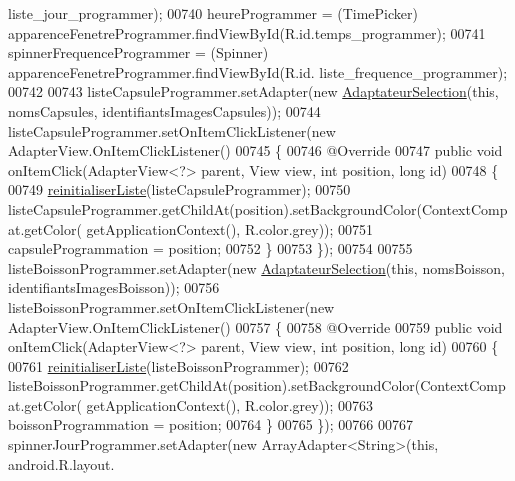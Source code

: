 \begin{DoxyCode}
      liste\_jour\_programmer);
00740         heureProgrammer = (TimePicker) apparenceFenetreProgrammer.findViewById(R.id.temps\_programmer);
00741         spinnerFrequenceProgrammer = (Spinner) apparenceFenetreProgrammer.findViewById(R.id.
      liste\_frequence\_programmer);
00742 
00743         listeCapsuleProgrammer.setAdapter(\textcolor{keyword}{new} \hyperlink{classcom_1_1example_1_1ekawa_1_1_ihm_1_1_adaptateur_selection_a41746ec1a290651b4cacb0894a32307b}{AdaptateurSelection}(\textcolor{keyword}{this}, nomsCapsules, 
      identifiantsImagesCapsules));
00744         listeCapsuleProgrammer.setOnItemClickListener(\textcolor{keyword}{new} AdapterView.OnItemClickListener()
00745         \{
00746             @Override
00747             \textcolor{keyword}{public} \textcolor{keywordtype}{void} onItemClick(AdapterView<?> parent, View view, \textcolor{keywordtype}{int} position, \textcolor{keywordtype}{long} \textcolor{keywordtype}{id})
00748             \{
00749                 \hyperlink{classcom_1_1example_1_1ekawa_1_1_ihm_a4c6ea5a7de9f8fc5c820fa4c8ce14838}{reinitialiserListe}(listeCapsuleProgrammer);
00750                 listeCapsuleProgrammer.getChildAt(position).setBackgroundColor(ContextCompat.getColor(
      getApplicationContext(), R.color.grey));
00751                 capsuleProgrammation = position;
00752             \}
00753         \});
00754 
00755         listeBoissonProgrammer.setAdapter(\textcolor{keyword}{new} \hyperlink{classcom_1_1example_1_1ekawa_1_1_ihm_1_1_adaptateur_selection_a41746ec1a290651b4cacb0894a32307b}{AdaptateurSelection}(\textcolor{keyword}{this}, nomsBoisson, 
      identifiantsImagesBoisson));
00756         listeBoissonProgrammer.setOnItemClickListener(\textcolor{keyword}{new} AdapterView.OnItemClickListener()
00757         \{
00758             @Override
00759             \textcolor{keyword}{public} \textcolor{keywordtype}{void} onItemClick(AdapterView<?> parent, View view, \textcolor{keywordtype}{int} position, \textcolor{keywordtype}{long} \textcolor{keywordtype}{id})
00760             \{
00761                 \hyperlink{classcom_1_1example_1_1ekawa_1_1_ihm_a4c6ea5a7de9f8fc5c820fa4c8ce14838}{reinitialiserListe}(listeBoissonProgrammer);
00762                 listeBoissonProgrammer.getChildAt(position).setBackgroundColor(ContextCompat.getColor(
      getApplicationContext(), R.color.grey));
00763                 boissonProgrammation = position;
00764             \}
00765         \});
00766 
00767         spinnerJourProgrammer.setAdapter(\textcolor{keyword}{new} ArrayAdapter<String>(\textcolor{keyword}{this}, android.R.layout.

\end{DoxyCode}
